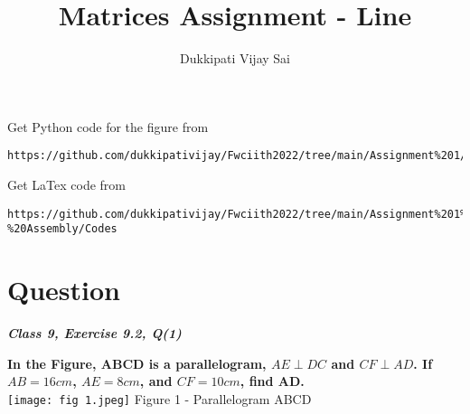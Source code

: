 \documentclass[journal,12pt,twocolumn]{IEEEtran}
\begin{document}
\makeatother
\let\StandardTheFigure\thefigure
\let\vec\mathbf
\renewcommand{\thefigure}{\theproblem}
\def\putbox#1#2#3{\makebox[0in][l]{\makebox[#1][l]{}\raisebox{\baselineskip}[0in][0in]{\raisebox{#2}[0in][0in]{#3}}}}
     \def\rightbox#1{\makebox[0in][r]{#1}}
     \def\centbox#1{\makebox[0in]{#1}}
     \def\topbox#1{\raisebox{-\baselineskip}[0in][0in]{#1}}
     \def\midbox#1{\raisebox{-0.5\baselineskip}[0in][0in]{#1}}
\vspace{3cm}
\title{\textbf{Matrices Assignment - Line} }
\author{Dukkipati Vijay Sai}
\maketitle
\newpage
\bigskip
\renewcommand{\thefigure}{\theenumi}
\renewcommand{\thetable}{\theenumi}
Get Python code for the figure from 
\begin{lstlisting}
https://github.com/dukkipativijay/Fwciith2022/tree/main/Assignment%201/Codes/src
\end{lstlisting}
Get LaTex code from
\begin{lstlisting}
https://github.com/dukkipativijay/Fwciith2022/tree/main/Assignment%201%20-%20Assembly/Codes
\end{lstlisting}
%
\section{Question}
\centering
\textbf{\textit{Class 9, Exercise 9.2, Q(1)}}\\
\vspace{0.25cm}
\raggedright
\fi
\textbf{In the Figure, ABCD is a parallelogram, $AE \perp DC$ and $CF \perp AD$. If $AB = 16 cm$, $AE = 8 cm$, and $CF = 10cm$, find AD.} \\
\centering
\texttt{[image: fig 1.jpeg]}
Figure 1 - Parallelogram ABCD
\end{document}
